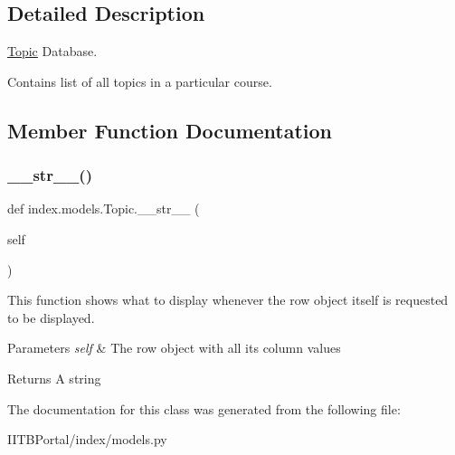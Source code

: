 \subsection{Detailed Description}
\hyperlink{classindex_1_1models_1_1Topic}{Topic} Database. 

Contains list of all topics in a particular course. 

\subsection{Member Function Documentation}
\mbox{\label{classindex_1_1models_1_1Topic_ad2cb1f53cfc3ca252ca47fb915758549}} 
\subsubsection{\texorpdfstring{\+\_\+\+\_\+str\+\_\+\+\_\+()}{\_\_str\_\_()}}
{\footnotesize\ttfamily def index.\+models.\+Topic.\+\_\+\+\_\+str\+\_\+\+\_\+ (\begin{DoxyParamCaption}\item[{}]{self }\end{DoxyParamCaption})}



This function shows what to display whenever the row object itself is requested to be displayed. 


\begin{DoxyParams}{Parameters}
{\em self} & The row object with all its column values \\
\hline
\end{DoxyParams}
\begin{DoxyReturn}{Returns}
A string 
\end{DoxyReturn}


The documentation for this class was generated from the following file\+:\begin{DoxyCompactItemize}
\item 
I\+I\+T\+B\+Portal/index/models.\+py\end{DoxyCompactItemize}
